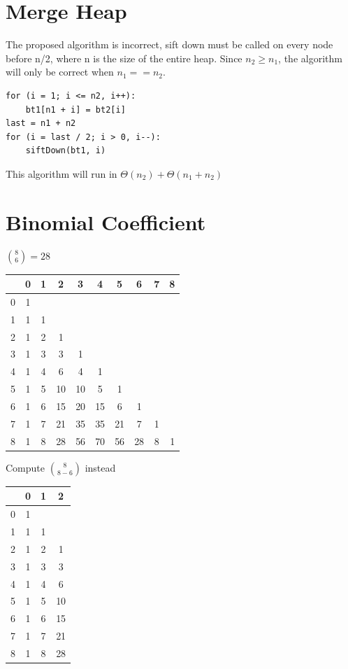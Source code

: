 \documentclass[a4paper,12pt]{article}
\begin{document}
\section{Merge Heap}
The proposed algorithm is incorrect, sift down must be called on every node before n/2, where
n is the size of the entire heap. Since $n_2 \geq n_1$, the algorithm will only be correct when
$n_1 == n_2$.
\begin{lstlisting}
for (i = 1; i <= n2, i++):
    bt1[n1 + i] = bt2[i]
last = n1 + n2
for (i = last / 2; i > 0, i--):
    siftDown(bt1, i)
\end{lstlisting}
This algorithm will run in $\Theta(n_2) + \Theta(n_1 + n_2)$

\section{Binomial Coefficient}

$\binom{8}{6} = 28$
\vspace{0.5em}

\begin{tabular}{ | l || c | c | c | c | c | c | c | c | r | }
  \hline
    & 0 & 1 & 2 & 3 & 4 & 5 & 6 & 7 & 8\\ \hline\hline
  0 & 1 \\ \hline
  1 & 1 & 1  \\ \hline
  2 & 1 & 2 & 1 \\ \hline
  3 & 1 & 3 & 3 & 1 \\ \hline
  4 & 1 & 4 & 6 & 4 & 1 \\ \hline
  5 & 1 & 5 & 10 & 10 & 5 & 1\\ \hline
  6 & 1 & 6 & 15 & 20 & 15 & 6 & 1\\ \hline
  7 & 1 & 7 & 21 & 35 & 35 & 21 & 7 & 1\\ \hline
  8 & 1 & 8 & 28 & 56 & 70 & 56 & 28 & 8 & 1\\ \hline
\end{tabular}

\vspace{1em}
Compute $\binom{8}{8-6}$ instead
\vspace{0.5em}

\begin{tabular}{ | l || c | c | c |}
  \hline
     & 0 & 1 & 2 \\ \hline\hline
  0  & 1 \\ \hline
  1  & 1 & 1 \\ \hline
  2  & 1 & 2 & 1 \\ \hline
  3  & 1 & 3 & 3 \\ \hline
  4  & 1 & 4 & 6 \\ \hline
  5  & 1 & 5 & 10 \\ \hline
  6  & 1 & 6 & 15 \\ \hline
  7  & 1 & 7 & 21 \\ \hline
  8  & 1 & 8 & 28 \\ \hline
\end{tabular}
\end{document}
